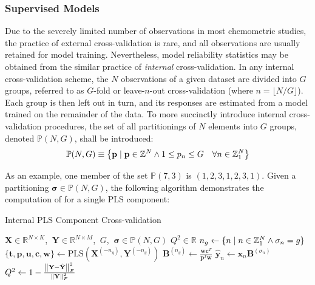 \subsubsection{Supervised Models}

\begin{doublespace}
Due to the severely limited number of observations in most chemometric studies,
the practice of external cross-validation is rare, and all observations are
usually retained for model training. Nevertheless, model reliability statistics
may be obtained from the similar practice of \emph{internal} cross-validation.
In any internal cross-validation scheme, the $N$ observations of a given
dataset are divided into $G$ groups, referred to as $G$-fold or
leave-$n$-out cross-validation (where $n = \lfloor N / G \rfloor$). Each
group is then left out in turn, and its responses are estimated from a model
trained on the remainder of the data. To more succinctly introduce internal
cross-validation procedures, the set of all partitionings of $N$ elements into
$G$ groups, denoted $\mathbb{P}(N, G)$, shall be introduced:
\begin{equation}
\mathbb{P}(N, G) \equiv \big\{
 \mathbf{p} \mid \mathbf{p} \in \mathbb{Z}^N
 \wedge
 1 \le p_n \le G
 \quad \forall n \in \mathbb{Z}_{1}^{N}
\big\}
\end{equation}

As an example, one member of the set $\mathbb{P}(7, 3)$ is $(1,2,3,1,2,3,1)$.
Given a partitioning $\boldsymbol{\sigma} \in \mathbb{P}(N, G)$, the following
algorithm demonstrates the computation of \qsq{} for a single PLS component:
\end{doublespace}

\begin{algorithm}[H]
\caption{Internal PLS Component Cross-validation}
\label{algorithm.3.8}
\begin{algorithmic}[1]
\REQUIRE $\mathbf{X} \in \mathbb{R}^{N \times K}$,%
       $\:\mathbf{Y} \in \mathbb{R}^{N \times M}$,%
       $\:G$, $\:\boldsymbol{\sigma} \in \mathbb{P}(N, G)$
\ENSURE $Q^2 \in \mathbb{R}$
  \STATE $n_g \gets \{ n \mid n \in \mathbb{Z}_{1}^{N} \wedge \sigma_n = g \}$
  \STATE $\{\mathbf{t}, \mathbf{p}, \mathbf{u}, \mathbf{c}, \mathbf{w}\}
          \gets \mathrm{PLS}(\mathbf{X}^{(-n_g)},
                             \mathbf{Y}^{(-n_g)})$ 
  \STATE $\mathbf{B}^{(n_g)} \gets \tfrac{\mathbf{w} \mathbf{c}^T}
                                         {\mathbf{p}^T \mathbf{w}}$
\ENDFOR
{}
  \STATE $\hat{\mathbf{y}}_n \gets
          \mathbf{x}_n \mathbf{B}^{(\sigma_n)}$ 
\ENDFOR
\STATE $Q^2 \gets 1 - \frac{\left\| \mathbf{Y} - \hat{\mathbf{Y}} \right\|_F^2}
                           {\left\| \mathbf{Y} \right\|_F^2}$
\end{algorithmic}
\end{algorithm}

